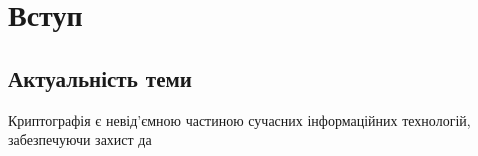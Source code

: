 \chapter*{Вступ}

\section{Актуальність теми}
Криптографія є невід'ємною частиною сучасних інформаційних технологій, забезпечуючи захист да